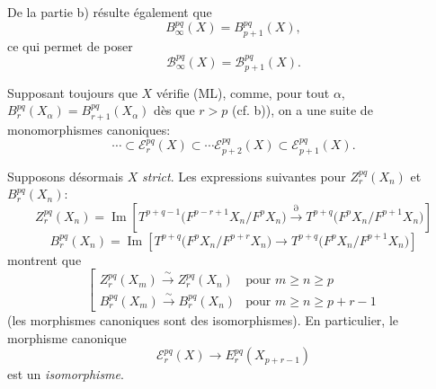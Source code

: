 \documentclass[11pt]{article}
\providecommand{\Im}{\operatorname{Im}}
\renewcommand{\Im}{\operatorname{Im}}
\providecommand{\Im}{\operatorname{Im}}
\begin{document}
De la partie b) résulte également que
\[
B_\infty^{pq}(X)=B_{p+1}^{pq}(X),
\]
ce qui permet de poser
\[
\mathcal B_\infty^{pq}(X)=\mathcal B_{p+1}^{pq}(X).
\]

Supposant toujours que \(X\) vérifie (ML), comme, pour tout \(\alpha\),
\(B_r^{pq}(X_\alpha)=B_{r+1}^{pq}(X_\alpha)\) dès que \(r>p\) (cf. b)),
on a une suite de monomorphismes canoniques:
\begin{equation}
\cdots\subset\mathcal E_r^{pq}(X)\subset\cdots\mathcal E_{p+2}^{pq}(X)\subset\mathcal E_{p+1}^{pq}(X).
\tag{S}
\end{equation}

Supposons désormais \(X\) \emph{strict}. Les expressions suivantes pour \(Z_r^{pq}(X_n)\) et \(B_r^{pq}(X_n)\):
\[
Z_r^{pq}(X_n)=
\Im\!\left[
T^{p+q-1}\bigl(F^{p-r+1}X_n/F^pX_n\bigr)
\xrightarrow{\partial}
T^{p+q}\bigl(F^pX_n/F^{p+1}X_n\bigr)
\right]
\]
\[
B_r^{pq}(X_n)=
\Im\!\left[
T^{p+q}\bigl(F^pX_n/F^{p+r}X_n\bigr)
\longrightarrow
T^{p+q}\bigl(F^pX_n/F^{p+1}X_n\bigr)
\right]
\]
montrent que
\begin{equation}
\left[
\begin{array}{ll}
Z_r^{pq}(X_m)\xrightarrow{\sim}Z_r^{pq}(X_n)&\text{pour }m\ge n\ge p\\[3pt]
B_r^{pq}(X_m)\xrightarrow{\sim}B_r^{pq}(X_n)&\text{pour }m\ge n\ge p+r-1
\end{array}
\right.
\tag{\(d_1\)}
\end{equation}
(les morphismes canoniques sont des isomorphismes). En particulier, le morphisme canonique
\[
\mathcal E_r^{pq}(X)\longrightarrow E_r^{pq}(X_{p+r-1})
\]
est un \emph{isomorphisme}.
\end{document}
